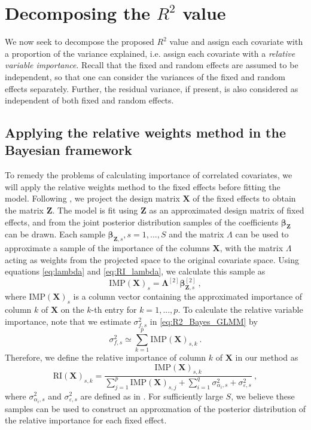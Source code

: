     
    


\section{Decomposing the $R^2$ value}
We now seek to decompose the proposed $R^2$ value and assign each covariate with a proportion of the variance explained, i.e. assign each covariate with a \textit{relative variable importance}. Recall that the fixed and random effects are assumed to be independent, so that one can consider the variances of the fixed and random effects separately. Further, the residual variance, if present, is also considered as independent of both fixed and random effects. 
\subsection{Applying the relative weights method in the Bayesian framework}
To remedy the problems of calculating importance of correlated covariates, we will apply the relative weights method to the fixed effects before fitting the model. Following , we project the design matrix $\mathbf{X}$ of the fixed effects to obtain the matrix $\mathbf{Z}$. The model is fit using $\mathbf{Z}$ as an approximated design matrix of fixed effects, and from the joint posterior distribution samples of the coefficients $\boldsymbol{\beta}_{\mathbf{Z}}$ can be drawn. Each sample $\boldsymbol{\beta}_{\mathbf{Z}, s}, s=1, ..., S$ and the matrix $\Lambda$ can be used to approximate a sample of the importance of the columns $\mathbf{X}$, with the matrix $\Lambda$ acting as weights from the projected space to the original covariate space. Using equations \eqref{eq:lambda} and \eqref{eq:RI_lambda}, we calculate this sample as
\begin{equation}
    \text{IMP}(\mathbf{X})_s = \boldsymbol{\Lambda}^{[2]} \boldsymbol{\beta}_{\mathbf{Z}, s}^{[2]} \ ,
\end{equation}
where $\text{IMP}(\mathbf{X})_s$ is a column vector containing the approximated importance of column $k$ of $\mathbf{X}$ on the $k$-th entry for $k=1, ..., p$. To calculate the relative variable importance, note that we estimate $\sigma^2_{f, s}$ in \eqref{eq:R2_Bayes_GLMM} by
\begin{equation}
    \sigma^2_{f, s} \simeq \sum_{k=1}^{p}\text{IMP}(\mathbf{X})_{s, k}  \ . 
\end{equation}
Therefore, we define the relative importance of column $k$ of $\mathbf{X}$ in our method as
\begin{equation}
    \label{eq:RI_X}
    \text{RI}(\mathbf{X})_{s, k} = \frac{\text{IMP}(\mathbf{X})_{s, k}}{\sum_{j=1}^{p}\text{IMP}(\mathbf{X})_{s, j} + \sum_{i=1}^q \sigma_{\alpha_i, s}^2 + \sigma_{\varepsilon, s}^2} \ ,
\end{equation}
where $\sigma_{\alpha_i, s}^2$ and  $\sigma_{\varepsilon, s}^2$ are defined as in .
For sufficiently large $S$, we believe these samples can be used to construct an approxmation of the posterior distribution of the relative importance for each fixed effect. 

